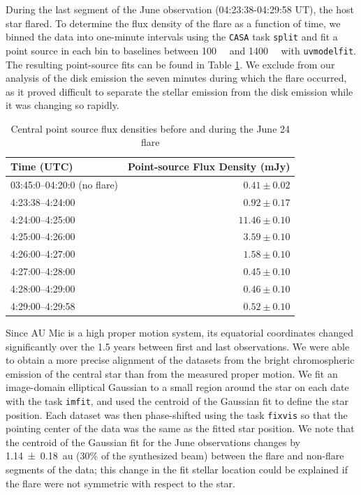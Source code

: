 \documentclass[modern]{aastex62}
\begin{document}
During the last segment of the June observation (04:23:38-04:29:58 UT), the host star flared. 
To determine the flux density of the flare as a function of time, we binned the data into one-minute intervals using the \texttt{CASA} task \texttt{split} and fit a point source in each bin to baselines between \SI{100}{\kilo \lambda} and \SI{1400}{\kilo \lambda} with \texttt{uvmodelfit}. 
The resulting point-source fits can be found in Table \ref{tab:flare fluxes}. 
We exclude from our analysis of the disk emission the seven minutes during which the flare occurred, as it proved difficult to separate the stellar emission from the disk emission while it was changing so rapidly.

\begin{table}	
  \centering
  \begin{tabular}{lr}
    \toprule
    Time (UTC) & Point-source Flux Density (\si{mJy}) \\
    \midrule
    03:45:0--04:20:0 (no flare) & $0.41 \pm 0.02$\\
  	4:23:38--4:24:00 & $0.92 \pm 0.17$ \\
  	4:24:00--4:25:00 & $11.46 \pm 0.10$ \\
  	4:25:00--4:26:00 & $3.59 \pm 0.10$ \\
  	4:26:00--4:27:00 & $1.58 \pm 0.10$ \\
  	4:27:00--4:28:00 & $0.45 \pm 0.10$ \\
  	4:28:00--4:29:00 & $0.46 \pm 0.10$ \\
  	4:29:00--4:29:58 & $0.52 \pm 0.10$\\
    \bottomrule
  \end{tabular}
	\caption{Central point source flux densities before and during the June 24 flare}
  \label{tab:flare fluxes}
\end{table}


Since AU Mic is a high proper motion system, its equatorial coordinates changed significantly over the 1.5 years between first and last observations.  
We were able to obtain a more precise alignment of the datasets from the bright chromospheric emission of the central star than from the measured proper motion.
We fit an image-domain elliptical Gaussian to a small region around the star on each date with the task \texttt{imfit}, and used the centroid of the Gaussian fit to define the star position.
Each dataset was then phase-shifted using the task \texttt{fixvis} so that the pointing center of the data was the same as the fitted star position.
We note that the centroid of the Gaussian fit for the June observations changes by \SI{1.14 \pm 0.18}{au} (30\% of the synthesized beam) between the flare and non-flare segments of the data; this change in the fit stellar location could be explained if the flare were not symmetric with respect to the star.
\end{document}
